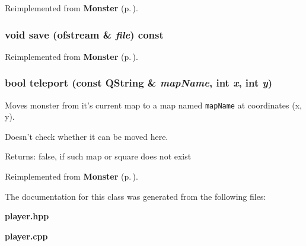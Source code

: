 Reimplemented from {\bf Monster} {\rm (p.\,\pageref{classMonster_a8})}.
\subsubsection{\setlength{\rightskip}{0pt plus 5cm}void save (ofstream \& {\em file}) const\hspace{0.3cm}{\tt  [virtual]}}\label{classPlayer_a1}




Reimplemented from {\bf Monster} {\rm (p.\,\pageref{classMonster_a4})}.
\subsubsection{\setlength{\rightskip}{0pt plus 5cm}bool teleport (const QString \& {\em map\-Name}, int {\em x}, int {\em y})\hspace{0.3cm}{\tt  [virtual]}}\label{classPlayer_a3}


Moves monster from it's current map to a map named {\tt map\-Name} at coordinates (x, y). 

Doesn't check whether it can be moved here. \begin{Desc}
\item[Returns:]false, if such map or square does not exist\end{Desc}


Reimplemented from {\bf Monster} {\rm (p.\,\pageref{classMonster_a32})}.

The documentation for this class was generated from the following files:\begin{CompactItemize}
\item 
{\bf player.hpp}\item 
{\bf player.cpp}\end{CompactItemize}
